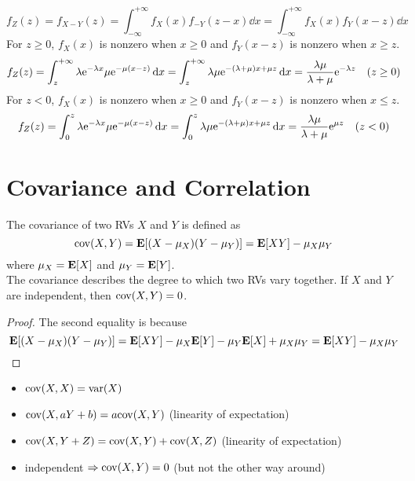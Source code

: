 \begin{solution}
    \begin{equation}
        f_{Z}(z) = f_{X-Y}(z) = \int_{-\infty}^{+\infty} f_{X}(x) f_{-Y}(z - x) \dd{x} = \int_{-\infty}^{+\infty} f_{X}(x) f_{Y}(x - z) \dd{x}
    \end{equation}
    For $z \geq 0$, $f_{X}(x)$ is nonzero when $x \geq 0$ and $f_{Y}(x - z)$ is nonzero when $x \geq z$.
    \begin{equation}
        f_{Z}(z) = \int_{z}^{+\infty} \lambda \mathrm{e}^{-\lambda x} \mu \mathrm{e}^{-\mu (x - z)} \dd{x} = \int_{z}^{+\infty} \lambda \mu \mathrm{e}^{-(\lambda + \mu)x + \mu z} \dd{x} = \frac{\lambda \mu}{\lambda + \mu} \mathrm{e}^{-\lambda z} \quad (z \geq 0)
    \end{equation}
    For $z < 0$, $f_{X}(x)$ is nonzero when $x \geq 0$ and $f_{Y}(x - z)$ is nonzero when $x \leq z$.
    \begin{equation}
        f_{Z}(z) = \int_{0}^{z} \lambda \mathrm{e}^{-\lambda x} \mu \mathrm{e}^{-\mu (x - z)} \dd{x} = \int_{0}^{z} \lambda \mu \mathrm{e}^{-(\lambda + \mu)x + \mu z} \dd{x} = \frac{\lambda \mu}{\lambda + \mu} \mathrm{e}^{\mu z} \quad (z < 0)
    \end{equation}
\end{solution}


\section{Covariance and Correlation}
\begin{definition}[Covariance]
    The covariance of two RVs $X$ and $Y$ is defined as
    \begin{equation}
        \mathrm{cov}(X, Y) = \mathbf{E}[(X - \mu_X)(Y - \mu_Y)] = \mathbf{E}[XY] - \mu_X \mu_Y
    \end{equation}
    where $\mu_X = \mathbf{E}[X]$ and $\mu_Y = \mathbf{E}[Y]$. \\ 
    The covariance describes the degree to which two RVs vary together. If $X$ and $Y$ are independent, then $\mathrm{cov}(X, Y) = 0$. 
\end{definition}
\begin{proof}
    The second equality is because
    \begin{equation}
        \mathbf{E}[(X - \mu_X)(Y - \mu_Y)] = \mathbf{E}[XY] - \mu_X \mathbf{E}[Y] - \mu_Y \mathbf{E}[X] + \mu_X \mu_Y
        = \mathbf{E}[XY] - \mu_X \mu_Y
    \end{equation}
\end{proof}
\begin{property}
    \begin{itemize}
        \item $\mathrm{cov}(X, X) = \mathrm{var}(X)$
        \item $\mathrm{cov}(X, aY + b) = a \mathrm{cov}(X, Y)$ (linearity of expectation)
        \item $\mathrm{cov}(X, Y + Z) = \mathrm{cov}(X, Y) + \mathrm{cov}(X, Z)$ (linearity of expectation)
        \item independent $\Rightarrow \mathrm{cov}(X, Y) = 0$ (but not the other way around)
    \end{itemize}
\end{property}

